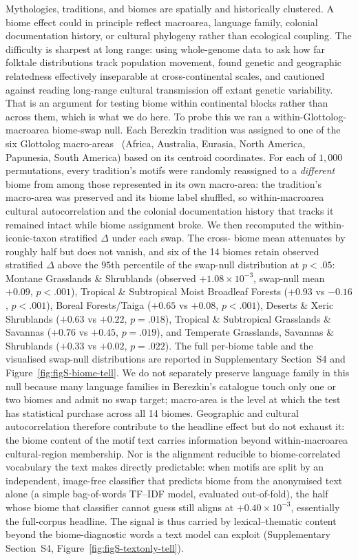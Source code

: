 \documentclass[11pt,a4paper]{article}
\begin{document}
Mythologies, traditions, and biomes are spatially and
historically clustered. A biome effect could in principle
reflect macroarea, language family, colonial documentation
history, or cultural phylogeny rather than ecological coupling.
The difficulty is sharpest at long range: using whole-genome data to
ask how far folktale distributions track population movement,
\citet{bortolini2017inferring} found genetic and geographic
relatedness effectively inseparable at cross-continental scales, and
cautioned against reading long-range cultural transmission off extant
genetic variability. That is an argument for testing biome within
continental blocks rather than across them, which is what we do here.
To probe this we ran a within-Glottolog-macroarea biome-swap
null. Each Berezkin tradition was assigned to one of the six
Glottolog macro-areas~\citep{hammarstrom2024glottolog} (Africa,
Australia, Eurasia, North America, Papunesia, South America) based on
its centroid coordinates. For each of $1{,}000$ permutations, every
tradition's motifs were randomly reassigned to a \emph{different}
biome from among those represented in its own macro-area: the
tradition's macro-area was preserved and its biome label
shuffled, so within-macroarea cultural autocorrelation and the
colonial documentation history that tracks it remained intact
while biome assignment broke. We then recomputed the within-
iconic-taxon stratified $\Delta$ under each swap. The cross-
biome mean attenuates by roughly half but does not vanish, and
six of the 14 biomes retain observed stratified $\Delta$ above
the $95$th percentile of the swap-null distribution at $p<.05$:
Montane Grasslands \& Shrublands (observed $+1.08\times 10^{-3}$,
swap-null mean $+0.09$, $p<.001$), Tropical \& Subtropical Moist
Broadleaf Forests ($+0.93$ vs $-0.16$, $p<.001$), Boreal
Forests/Taiga ($+0.65$ vs $+0.08$, $p<.001$), Deserts \& Xeric
Shrublands ($+0.63$ vs $+0.22$, $p=.018$), Tropical \&
Subtropical Grasslands \& Savannas ($+0.76$ vs $+0.45$,
$p=.019$), and Temperate Grasslands, Savannas \& Shrublands
($+0.33$ vs $+0.02$, $p=.022$). The full per-biome table and
the visualised swap-null distributions are reported in
Supplementary Section~S4 and
Figure~\ref{fig:figS-biome-tell}. We do not separately preserve
language family in this null because many language families in
Berezkin's catalogue touch only one or two biomes and admit no
swap target; macro-area is the level at which the test has
statistical purchase across all 14 biomes. Geographic and
cultural autocorrelation therefore contribute to the headline
effect but do not exhaust it: the biome content of the motif
text carries information beyond within-macroarea cultural-region
membership. Nor is the alignment reducible to biome-correlated
vocabulary the text makes directly predictable: when motifs are
split by an independent, image-free classifier that predicts biome
from the anonymised text alone (a simple bag-of-words TF--IDF model,
evaluated out-of-fold), the half whose biome that classifier cannot
guess still aligns at $+0.40\times 10^{-3}$, essentially the
full-corpus headline. The signal is thus carried by
lexical--thematic content beyond the biome-diagnostic words a text
model can exploit (Supplementary Section~S4,
Figure~\ref{fig:figS-textonly-tell}).
\end{document}
